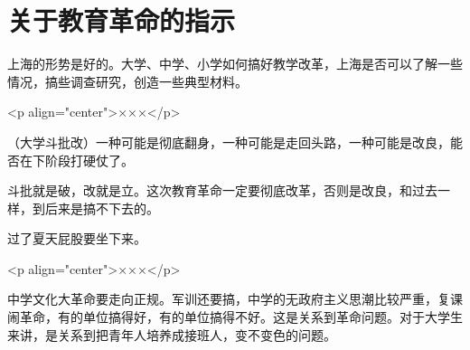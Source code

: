 \section[关于教育革命的指示（一九六七年七月）]{关于教育革命的指示}


上海的形势是好的。大学、中学、小学如何搞好教学改革，上海是否可以了解一些情况，搞些调查研究，创造一些典型材料。

<p align="center">×××</p>

（大学斗批改）一种可能是彻底翻身，一种可能是走回头路，一种可能是改良，能否在下阶段打硬仗了。

斗批就是破，改就是立。这次教育革命一定要彻底改革，否则是改良，和过去一样，到后来是搞不下去的。

过了夏天屁股要坐下来。

<p align="center">×××</p>

中学文化大革命要走向正规。军训还要搞，中学的无政府主义思潮比较严重，复课闹革命，有的单位搞得好，有的单位搞得不好。这是关系到革命问题。对于大学生来讲，是关系到把青年人培养成接班人，变不变色的问题。


